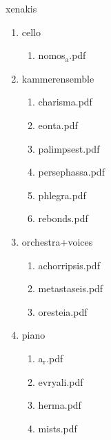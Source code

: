 \documentclass[11pt]{article}
\begin{document}
\item xenakis
\label{sec-1-1-1-1-44-75}
\begin{enumerate}
\item cello
\label{sec-1-1-1-1-44-75-1}
\begin{enumerate}
\item nomos$_{\text{a}}$.pdf
\label{sec-1-1-1-1-44-75-1-1}
\end{enumerate}

\item kammerensemble
\label{sec-1-1-1-1-44-75-2}
\begin{enumerate}
\item charisma.pdf
\label{sec-1-1-1-1-44-75-2-1}

\item eonta.pdf
\label{sec-1-1-1-1-44-75-2-2}

\item palimpsest.pdf
\label{sec-1-1-1-1-44-75-2-3}

\item persephassa.pdf
\label{sec-1-1-1-1-44-75-2-4}

\item phlegra.pdf
\label{sec-1-1-1-1-44-75-2-5}

\item rebonds.pdf
\label{sec-1-1-1-1-44-75-2-6}
\end{enumerate}

\item orchestra+voices
\label{sec-1-1-1-1-44-75-3}
\begin{enumerate}
\item achorripsis.pdf
\label{sec-1-1-1-1-44-75-3-1}

\item metastaseis.pdf
\label{sec-1-1-1-1-44-75-3-2}

\item oresteia.pdf
\label{sec-1-1-1-1-44-75-3-3}
\end{enumerate}

\item piano
\label{sec-1-1-1-1-44-75-4}
\begin{enumerate}
\item a$_{\text{r}}$.pdf
\label{sec-1-1-1-1-44-75-4-1}

\item evryali.pdf
\label{sec-1-1-1-1-44-75-4-2}

\item herma.pdf
\label{sec-1-1-1-1-44-75-4-3}

\item mists.pdf
\label{sec-1-1-1-1-44-75-4-4}
\end{enumerate}


\end{enumerate}
\end{document}
